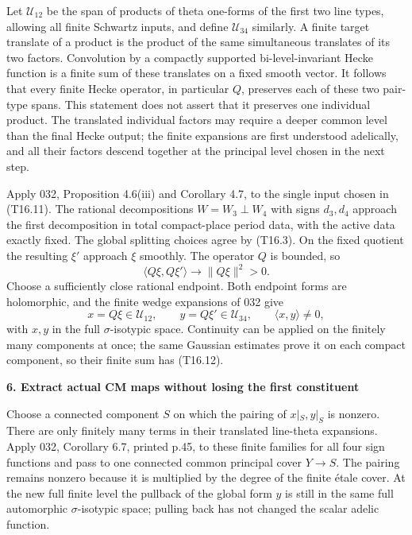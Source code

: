 Let \(\mathcal U_{12}\) be the span of products of theta one-forms of the first two line types, allowing all finite Schwartz inputs, and define \(\mathcal U_{34}\) similarly. A finite target translate of a product is the product of the same simultaneous translates of its two factors. Convolution by a compactly supported bi-level-invariant Hecke function is a finite sum of these translates on a fixed smooth vector. It follows that every finite Hecke operator, in particular \(Q\), preserves each of these two pair-type spans. This statement does not assert that it preserves one individual product. The translated individual factors may require a deeper common level than the final Hecke output; the finite expansions are first understood adelically, and all their factors descend together at the principal level chosen in the next step.

Apply 032, Proposition 4.6(iii) and Corollary 4.7, to the single input chosen in (T16.11). The rational decompositions \(W=W_3\perp W_4\) with signs \(d_3,d_4\) approach the first decomposition in total compact-place period data, with the active data exactly fixed. The global splitting choices agree by (T16.3). On the fixed quotient the resulting \(\xi'\) approach \(\xi\) smoothly. The operator \(Q\) is bounded, so \[
\langle Q\xi,Q\xi'\rangle\longrightarrow\|Q\xi\|^2>0.
\tag{T16.12}
\] Choose a sufficiently close rational endpoint. Both endpoint forms are holomorphic, and the finite wedge expansions of 032 give \[
x=Q\xi\in\mathcal U_{12},\qquad
y=Q\xi'\in\mathcal U_{34},\qquad
\langle x,y\rangle\ne0,
\tag{T16.13}
\] with \(x,y\) in the full \(\sigma\)-isotypic space. Continuity can be applied on the finitely many components at once; the same Gaussian estimates prove it on each compact component, so their finite sum has (T16.12).

\textbf{6. Extract actual CM maps without losing the first constituent}

Choose a connected component \(S\) on which the pairing of \(x|_S,y|_S\) is nonzero. There are only finitely many terms in their translated line-theta expansions. Apply 032, Corollary 6.7, printed p.45, to these finite families for all four sign functions and pass to one connected common principal cover \(Y\to S\). The pairing remains nonzero because it is multiplied by the degree of the finite étale cover. At the new full finite level the pullback of the global form \(y\) is still in the same full automorphic \(\sigma\)-isotypic space; pulling back has not changed the scalar adelic function.

